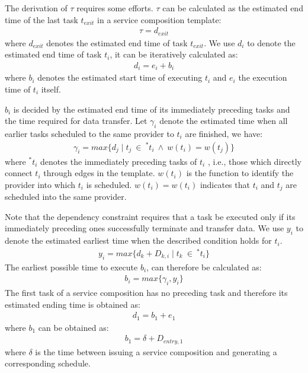 \documentclass[journal]{IEEEtran}
\begin{document}
The derivation of $\tau$ requires some efforts. $\tau$ can be calculated as the estimated end time of the last task $t_{exit}$ in a service composition template:
\begin{align}
\tau = d_{exit}
\end{align}
where $d_{exit}$ denotes the estimated end time of task $t_{exit}$. We use $d_i$ to denote the estimated end time of task $t_i$, it can be iteratively calculated as:
\begin{align}
d_i = e_i + b_i
\end{align}
where $b_i$ denotes the estimated start time of executing $t_i$ and $e_i$ the execution time of $t_i$ itself.

$b_i$ is decided by the estimated end time of its immediately preceding tasks and the time required for data transfer. Let $\gamma_i$ denote the estimated time when all earlier tasks scheduled to the same provider to $t_i$ are finished, we have:
\begin{align}
\gamma_i =  max\{d_j \mid t_j \ \in \ ^{*}t_i \ \wedge \ w(t_i) = w(t_j) \}
\end{align}
where $^{*}t_i$ denotes the immediately preceding tasks of $t_i$ , i.e., those which directly connect $t_i$ through edges in the template. 
$w(t_i)$ is the function to identify the provider into which $t_i$ is scheduled. $w(t_i) = w(t_i)$ indicates that $t_i$ and $t_j$ are scheduled into the same provider.

Note that the dependency constraint requires that a task be executed only if its immediately preceding ones successfully terminate and transfer data. We use $y_i$ to denote the estimated earliest time when the described condition holds for $t_i$.
\begin{align}
y_i = max \{d_k + D_{k,i} \mid t_k \ \in \ ^{*}t_i \} 
\end{align}
The earliest possible time to execute $b_i$, can therefore be calculated as:
\begin{align}
b_i = max \{ \gamma_i, y_i \}
\end{align}
The first task of a service composition has no preceding task and therefore its estimated ending time is obtained as:
\begin{align}
d_1 = b_1 + e_1
\end{align}
where $b_1$ can be obtained as:
\begin{align}
b_1 = \delta + D_{entry, 1}
\end{align}
where $\delta$ is the time between issuing a service composition and generating a corresponding schedule.
\end{document}
